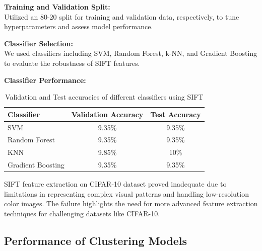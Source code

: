\documentclass[a4paper]{article}
\theoremstyle{plain}
\theoremstyle{definition}
\begin{document}
{\noindent\textbf{Training and Validation Split:} \\
Utilized an 80-20 split for training and validation data, respectively, to tune hyperparameters and assess model performance.\newline

\noindent\textbf{Classifier Selection:} \\
We used classifiers including SVM, Random Forest, k-NN, and Gradient Boosting to evaluate the robustness of SIFT features.\newline



\noindent \textbf{Classifier Performance:}

\begin{table}[H]
    \centering
    
    \begin{tabular}{lcc}
        \hline
        Classifier & Validation Accuracy & Test Accuracy \\
        \hline
        SVM & 9.35\% & 9.35\% \\
        Random Forest & 9.35\% & 9.35\% \\
        KNN & 9.85\% & 10\% \\
        Gradient Boosting & 9.35\% & 9.35\% \\
        \hline
     \end{tabular}
     \caption{Validation and Test accuracies of different classifiers using SIFT}
    \label{tab:hi}
\end{table}


\noindent
SIFT feature extraction on CIFAR-10 dataset proved inadequate due to limitations in representing complex visual patterns and handling low-resolution color images. The failure highlights the need for more advanced feature extraction techniques for challenging datasets like CIFAR-10.




   










\newpage
\subsection {Performance of Clustering Models}

}
\end{document}
